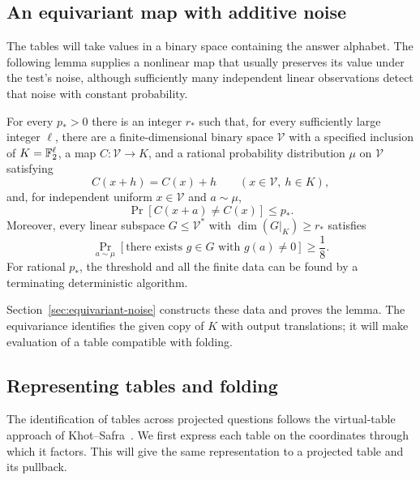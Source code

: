 \subsection{An equivariant map with additive noise}

The tables will take values in a binary space containing the answer alphabet.
The following lemma supplies a nonlinear map that usually preserves its value
under the test's noise, although sufficiently many independent linear
observations detect that noise with constant probability.

\begin{lemma}\label{lem:equivariant-noise}
For every $p_*>0$ there is an integer $r_*$ such that, for every sufficiently
large integer $\ell$, there are a finite-dimensional binary space
$\mathcal V$ with a specified inclusion of $K=\mathbb F_2^\ell$, a map
$C:\mathcal V\to K$, and a rational probability distribution $\mu$ on
$\mathcal V$ satisfying
\begin{equation}\label{eq:equivariant-noise-equivariance}
 C(x+h)=C(x)+h
 \qquad(x\in\mathcal V,\ h\in K),
\end{equation}
and, for independent uniform $x\in\mathcal V$ and $a\sim\mu$,
\begin{equation}\label{eq:equivariant-noise-small-change}
 \Pr[C(x+a)\ne C(x)]\le p_*.
\end{equation}
Moreover, every linear subspace $G\le\mathcal V^*$ with
$\dim(G|_K)\ge r_*$ satisfies
\begin{equation}\label{eq:equivariant-noise-detection}
 \Pr_{a\sim\mu}[\text{there exists }g\in G\text{ with }g(a)\ne0]
 \ge\frac18.
\end{equation}
For rational $p_*$, the threshold and all the finite data can be found by a
terminating deterministic algorithm.
\end{lemma}

Section~\ref{sec:equivariant-noise} constructs these data and proves the lemma.
The equivariance identifies the given copy of $K$ with output translations;
it will make evaluation of a table compatible with folding.

\subsection{Representing tables and folding}

The identification of tables across projected questions follows the
virtual-table approach of Khot--Safra~\cite[Section~1.1]{KS13}.
We first express each table on the coordinates through which it factors.
This will give the same representation to a projected table and its
pullback.

